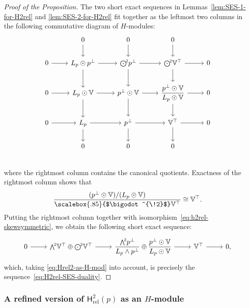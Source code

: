 \documentclass[11pt,reqno,a4paper,final]{amsart}
\newcommand\ext[1]{\scalebox{.85}{$\bigwedge^{\!#1}$}}
\newcommand\sym[1]{\scalebox{.85}{$\bigodot^{\!#1}$}}
\theoremstyle{plain}
\theoremstyle{definition}
\newcommand{\Hrel}{\mathsf{H}_{\mathrm{rel}}}
\newcommand{\VV}{\mathbb{V}}
\newcommand{\1}{\mathbb{1}}
\numberwithin{equation}{section}
\begin{document}
\begin{proof}[Proof of the Proposition]
  The two short exact sequences in Lemmas~\ref{lem:SES-1-for-H2rel} and
  \ref{lem:SES-2-for-H2rel} fit together as the leftmost two columns
  in the following commutative diagram of $H$-modules:
  \begin{equation}
    \label{eq:3x3-comm-diag}
    \begin{tikzcd}
      & 0 \arrow[d] & 0 \arrow[d] & 0 \arrow[d] & \\
      0 \arrow[r] & L_p \odot p^\perp \arrow[d] \arrow[r] & \sym{2} p^\perp \arrow[r] \arrow[d] & \sym{2} \VV^\top \arrow[r] \arrow[d] & 0\\
      0 \arrow[r] & L_p \odot \VV \arrow[d] \arrow[r] & p^\perp \odot \VV \arrow[r] \arrow[d] & \dfrac{p^\perp \odot \VV}{L_p \odot \VV} \arrow[r] \arrow[d] & 0\\
      0 \arrow[r] & L_p \arrow[d] \arrow[r] & p^\perp \arrow[r]  \arrow[d]  & \VV^\top \arrow[r] \arrow[d] & 0\\
      & 0  & 0 & 0 &\\
    \end{tikzcd}
  \end{equation}
  where the rightmost column contains the canonical quotients.
  Exactness of the rightmost column shows that
  \begin{equation}
    \dfrac{(p^\perp \odot \VV)/(L_p \odot \VV)}{\sym{2}\VV^\top} \cong  \VV^\top.
  \end{equation}
  Putting the rightmost column together with isomorphism~\eqref{eq:h2rel-skewsymmetric},
  we obtain the following short exact sequence:
  \begin{equation}
    \label{eq:SES-Hrel2-unitary}
    \begin{tikzcd}
      0 \arrow[r] & \ext{2} \VV^\top \oplus \sym{2} \VV^\top \arrow[r]
      & \dfrac{\ext{2}p^\perp}{L_p \wedge p^\perp} \oplus \dfrac{p^\perp \odot \VV}{L_p \odot \VV} \arrow[r] & \VV^\top \arrow[r] & 0,
    \end{tikzcd}
  \end{equation}
  which, taking \eqref{eq:Hrel2-as-H-mod} into account, is precisely the sequence~\eqref{eq:H2rel-SES-duality}.
\end{proof}

\subsubsection{A refined version of $\Hrel^2(p)$ as an  $H$-module}
\label{sec:more-refined-version}
\end{document}
